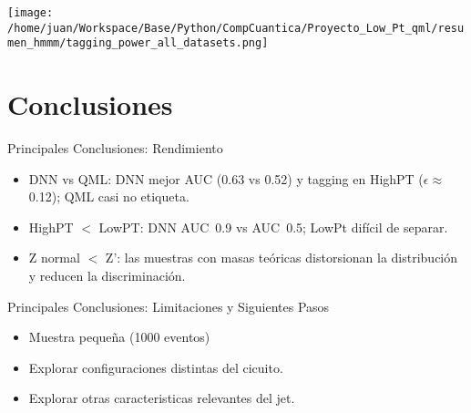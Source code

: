 \documentclass{beamer}
\begin{document}
\begin{frame}
  \texttt{[image: /home/juan/Workspace/Base/Python/CompCuantica/Proyecto\_Low\_Pt\_qml/resumen\_hmmm/tagging\_power\_all\_datasets.png]}
\end{frame}

\section{Conclusiones}

\begin{frame}{Principales Conclusiones: Rendimiento}
  \begin{itemize}
    \item DNN vs QML: DNN mejor AUC (0.63 vs 0.52) y tagging en HighPT ($\epsilon \approx$0.12); QML casi no etiqueta.
    \item HighPT $<$ LowPT: DNN AUC~0.9 vs AUC~0.5; LowPt difícil de separar.
    \item Z normal $<$ Z': las muestras con masas teóricas distorsionan la distribución y reducen la discriminación.
  \end{itemize}
\end{frame}

\begin{frame}{Principales Conclusiones: Limitaciones y Siguientes Pasos}
  \begin{itemize}
    \item Muestra pequeña (1000 eventos)
    \item Explorar configuraciones distintas del cicuito.
    \item Explorar otras caracteristicas relevantes del jet.
  \end{itemize}
\end{frame}
\end{document}
